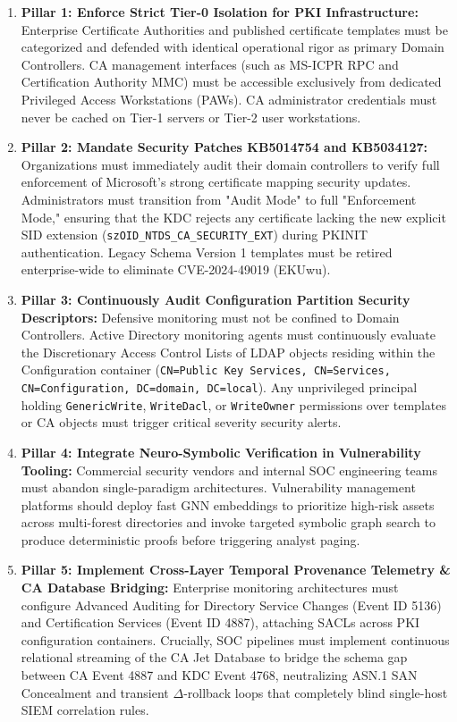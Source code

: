 \begin{enumerate}
    \item \textbf{Pillar 1: Enforce Strict Tier-0 Isolation for PKI Infrastructure:} Enterprise Certificate Authorities and published certificate templates must be categorized and defended with identical operational rigor as primary Domain Controllers. CA management interfaces (such as MS-ICPR RPC and Certification Authority MMC) must be accessible exclusively from dedicated Privileged Access Workstations (PAWs). CA administrator credentials must never be cached on Tier-1 servers or Tier-2 user workstations.
    
    \item \textbf{Pillar 2: Mandate Security Patches KB5014754 and KB5034127:} Organizations must immediately audit their domain controllers to verify full enforcement of Microsoft's strong certificate mapping security updates. Administrators must transition from "Audit Mode" to full "Enforcement Mode," ensuring that the KDC rejects any certificate lacking the new explicit SID extension (\texttt{szOID\_NTDS\_CA\_SECURITY\_EXT}) during PKINIT authentication. Legacy Schema Version 1 templates must be retired enterprise-wide to eliminate CVE-2024-49019 (EKUwu).
    
    \item \textbf{Pillar 3: Continuously Audit Configuration Partition Security Descriptors:} Defensive monitoring must not be confined to Domain Controllers. Active Directory monitoring agents must continuously evaluate the Discretionary Access Control Lists of LDAP objects residing within the Configuration container (\texttt{CN=Public Key Services, CN=Services, CN=Configuration, DC=domain, DC=local}). Any unprivileged principal holding \texttt{GenericWrite}, \texttt{WriteDacl}, or \texttt{WriteOwner} permissions over templates or CA objects must trigger critical severity security alerts.
    
    \item \textbf{Pillar 4: Integrate Neuro-Symbolic Verification in Vulnerability Tooling:} Commercial security vendors and internal SOC engineering teams must abandon single-paradigm architectures. Vulnerability management platforms should deploy fast GNN embeddings to prioritize high-risk assets across multi-forest directories and invoke targeted symbolic graph search to produce deterministic proofs before triggering analyst paging.
    
    \item \textbf{Pillar 5: Implement Cross-Layer Temporal Provenance Telemetry \& CA Database Bridging:} Enterprise monitoring architectures must configure Advanced Auditing for Directory Service Changes (Event ID 5136) and Certification Services (Event ID 4887), attaching SACLs across PKI configuration containers. Crucially, SOC pipelines must implement continuous relational streaming of the CA Jet Database to bridge the schema gap between CA Event 4887 and KDC Event 4768, neutralizing ASN.1 SAN Concealment and transient $\Delta$-rollback loops that completely blind single-host SIEM correlation rules.
\end{enumerate}

